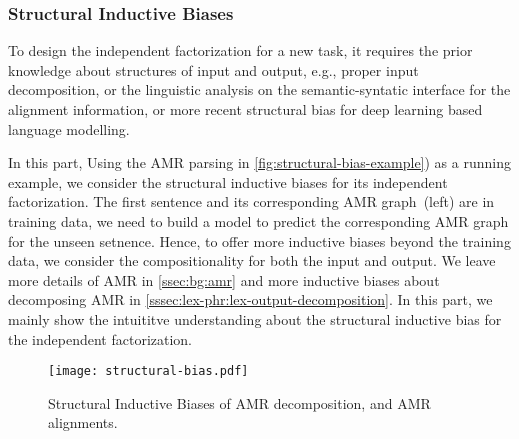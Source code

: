 {\subsubsection{Structural Inductive Biases}
\label{sssec:intro:structural-biases}
To design the independent factorization for a new task, it requires
the prior knowledge about structures of input and output, e.g., proper
input decomposition, or the linguistic analysis on the
semantic-syntatic interface for the alignment information, or more
recent structural bias for deep learning based language modelling.

In this part, Using the AMR parsing in
\autoref{fig:structural-bias-example}) as a running example, we
consider the structural inductive biases for its independent
factorization. The first sentence and its corresponding AMR
graph~(left) are in training data, we need to build a model to predict
the corresponding AMR graph for the unseen setnence. Hence, to offer
more inductive biases beyond the training data, we consider the
compositionality for both the input and output. We leave more details
of AMR in \autoref{ssec:bg:amr} and more inductive biases about
decomposing AMR in
\autoref{sssec:lex-phr:lex-output-decomposition}. In this part, we
mainly show the intuititve understanding about the structural
inductive bias for the independent factorization.

\begin{figure}[!th]
  \centering
  \texttt{[image: structural-bias.pdf]}
  \caption{\label{fig:structural-bias-example} Structural Inductive
    Biases of AMR decomposition, and AMR alignments.}
\end{figure}

}
